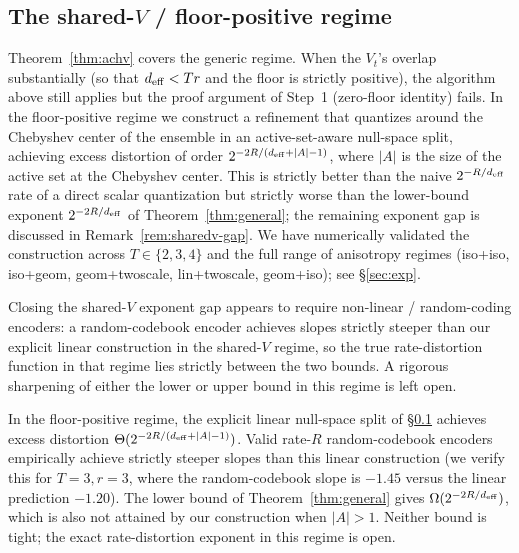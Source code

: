 \subsection{The shared-$V$ / floor-positive regime}
\label{subsec:sharedv}

Theorem~\ref{thm:achv} covers the generic regime. When the
$V_t$'s overlap substantially (so that $d_{\mathrm{eff}} < Tr$ and the
floor is strictly positive), the algorithm above still applies
but the proof argument of Step~1 (zero-floor identity) fails.
In the floor-positive regime we construct a refinement that
quantizes around the Chebyshev center of the ensemble in an
active-set-aware null-space split, achieving excess distortion
of order $2^{-2R/(d_{\mathrm{eff}} + |A| - 1)}$, where $|A|$ is the size
of the active set at the Chebyshev center. This is strictly
better than the naive $2^{-R/d_{\mathrm{eff}}}$ rate of a direct scalar
quantization but strictly worse than the lower-bound exponent
$2^{-2R/d_{\mathrm{eff}}}$ of Theorem~\ref{thm:general}; the remaining
exponent gap is discussed in Remark~\ref{rem:sharedv-gap}. We
have numerically validated the construction across
$T\in\{2,3,4\}$ and the full range of anisotropy regimes
(iso+iso, iso+geom, geom+twoscale, lin+twoscale, geom+iso); see
\S\ref{sec:exp}.

Closing the shared-$V$ exponent gap appears to require
non-linear / random-coding encoders: a random-codebook encoder
achieves slopes strictly steeper than our explicit linear
construction in the shared-$V$ regime, so the true
rate-distortion function in that regime lies strictly between
the two bounds. A rigorous sharpening of either the lower or
upper bound in this regime is left open.

\begin{remark}\label{rem:sharedv-gap}
In the floor-positive regime, the explicit linear null-space
split of \S\ref{subsec:sharedv} achieves excess distortion
$\Theta(2^{-2R/(d_{\mathrm{eff}}+|A|-1)})$. Valid rate-$R$ random-codebook
encoders empirically achieve strictly steeper slopes than this
linear construction (we verify this for $T=3, r=3$, where the
random-codebook slope is $-1.45$ versus the linear prediction
$-1.20$). The lower bound of
Theorem~\ref{thm:general} gives $\Omega(2^{-2R/d_{\mathrm{eff}}})$, which
is also not attained by our construction when $|A| > 1$. Neither
bound is tight; the exact rate-distortion exponent in this
regime is open.
\end{remark}
